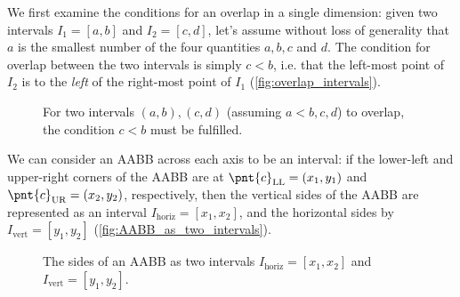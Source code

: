 We first examine the conditions for an overlap in a single dimension: given two intervals $I_{1}=[a,b]$ and $I_{2}=[c,d]$, let's assume without loss of generality that $a$ is the smallest number of the four quantities $a,b,c$ and $d$. The condition for overlap between the two intervals is simply $c<b$, i.e. that the left-most point of $I_{2}$ is to the \textit{left} of the right-most point of $I_{1}$ (\autoref{fig:overlap_intervals}).

\begin{figure}
	\forcecaptionside
	\begin{center}
	\end{center}
	\caption{For two intervals $(a,b),(c,d)$ (assuming $a<b,c,d$) to overlap, the condition $c<b$ must be fulfilled.}
	\label{fig:overlap_intervals}
\end{figure}

We can consider an AABB across each axis to be an interval: if the lower-left and upper-right corners of the AABB are at $\pnt{c}_{\text{LL}}=\left(x_{1},y_{1}\right)$ and $\pnt{c}_{\text{UR}}=\left(x_{2},y_{2}\right)$, respectively, then the vertical sides of the AABB are represented as an interval $I_{\text{horiz}}=\left[x_{1},x_{2}\right]$, and the horizontal sides by $I_{\text{vert}}=\left[y_{1},y_{2}\right]$ (\autoref{fig:AABB_as_two_intervals}).

\begin{figure}
	\begin{center}
	\end{center}
	\caption{The sides of an AABB as two intervals $I_{\text{horiz}}=\left[x_{1},x_{2}\right]$ and $I_{\text{vert}}=\left[y_{1},y_{2}\right]$.}
	\label{fig:AABB_as_two_intervals}
\end{figure}

